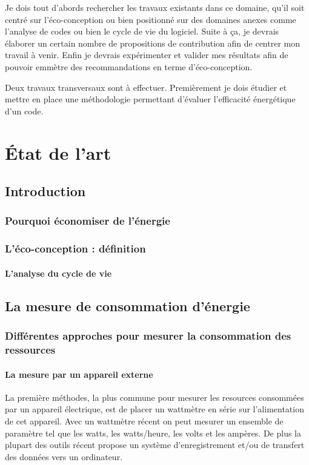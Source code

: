\documentclass[a4paper, 11pt]{report}
\begin{document}
Je dois tout d'abords rechercher les travaux existants dans ce domaine, qu'il soit centré sur l'éco-conception ou bien positionné sur des domaines anexes comme l'analyse de codes ou bien le cycle de vie du logiciel. Suite à ça, je devrais élaborer un certain nombre de propositions de contribution afin de centrer mon travail à venir. Enfin je devrais expérimenter et valider mes résultats afin de pouvoir emmètre des recommandations en terme d'éco-conception.

Deux travaux transversaux sont à effectuer. Premièrement je dois étudier et mettre en place une méthodologie permettant d'évaluer l'efficacité énergétique d'un code.

\chapter{État de l'art}
	\section{Introduction}
		\subsection{Pourquoi économiser de l'énergie}

		
		\subsection{L'éco-conception : définition}
			\subsubsection{L'analyse du cycle de vie}
			
		
	\section{La mesure de consommation d'énergie}
		\subsection{Différentes approches pour mesurer la consommation des ressources}
			\subsubsection{La mesure par un appareil externe}
La première méthodes, la plus commune pour mesurer les resources consommées par un appareil électrique, est de placer un wattmètre en série sur l'alimentation de cet appareil. Avec un wattmètre récent on peut mesurer un ensemble de paramètre tel que les watts, les watts/heure, les volts et les ampères. De plus la plupart des outils récent propose un système d'enregistrement et/ou de transfert des données vers un ordinateur.
\end{document}
